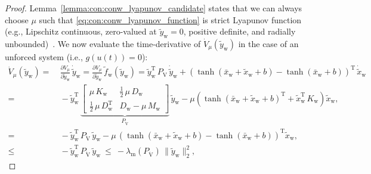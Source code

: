 \begin{proof}
    Lemma~\ref{lemma:con:conw_lyapunov_candidate} states that we can always choose $\mu$ such that \eqref{eq:con:conw_lyapunov_function} is strict Lyapunov function (e.g., Lipschitz continuous, zero-valued at $\tilde{y}_\mathrm{w} = 0$, positive definite, and radially unbounded)~\cite{khalil2002nonlinear, wu2022passive}. We now evaluate the time-derivative of $\dot{V}_\mu(\tilde{y}_\mathrm{w})$ in the case of an unforced system (i.e., $g(u(t)) = 0$):
    \begin{equation}\label{eq:con:lyapunov_function_time_derivative}
    \begin{split}
        \dot{V}_\mu(\tilde{y}_\mathrm{w}) =& \: \frac{\partial V_\mu}{\partial \tilde{y}_\mathrm{w}} \, \dot{\tilde{y}}_\mathrm{w} = \frac{\partial V_\mu}{\partial \tilde{y}_\mathrm{w}} \, \tilde{f}_\mathrm{w}(\tilde{y}_\mathrm{w}) 
        = \tilde{y}_\mathrm{w}^\mathrm{T} \, P_\mathrm{V} \, \dot{\tilde{y}}_\mathrm{w} + \left (\tanh(\bar{x}_\mathrm{w} + \tilde{x}_\mathrm{w} + b) - \tanh(\bar{x}_\mathrm{w} + b)\right )^\mathrm{T} \, \dot{\tilde{x}}_\mathrm{w}\\
        =& \: -\tilde{y}_\mathrm{w}^\mathrm{T} \, \underbrace{\begin{bmatrix}
            \mu \, K_\mathrm{w} & \frac{1}{2} \, \mu \, D_\mathrm{w}\\
            \frac{1}{2} \, \mu \, D_\mathrm{w}^\mathrm{T} & D_\mathrm{w} - \mu \, M_\mathrm{w}
        \end{bmatrix}}_{P_{\dot{\mathrm{V}}}} \, \tilde{y}_\mathrm{w} - \mu \left ( \tanh(\bar{x}_\mathrm{w} + \tilde{x}_\mathrm{w} + b)^\mathrm{T} + \tilde{x}_\mathrm{w}^\mathrm{T} \, K_\mathrm{w} \right ) \tilde{x}_\mathrm{w},\\
        =& \: -\tilde{y}_\mathrm{w}^\mathrm{T} \, P_{\dot{\mathrm{V}}} \, \tilde{y}_\mathrm{w} - \mu \, \left ( \tanh(\bar{x}_\mathrm{w} + \tilde{x}_\mathrm{w} + b) - \tanh(\bar{x}_\mathrm{w} + b) \right )^\mathrm{T} \tilde{x}_\mathrm{w},\\
        \leq& \: -\tilde{y}_\mathrm{w}^\mathrm{T} \, P_{\dot{\mathrm{V}}} \, \tilde{y}_\mathrm{w} 
        \: \leq \: -\lambda_\mathrm{m}\left(P_{\dot{\mathrm{V}}} \right) \, \lVert \tilde{y}_\mathrm{w} \rVert_2^2,
    \end{split}
    \end{equation}

\end{proof}
